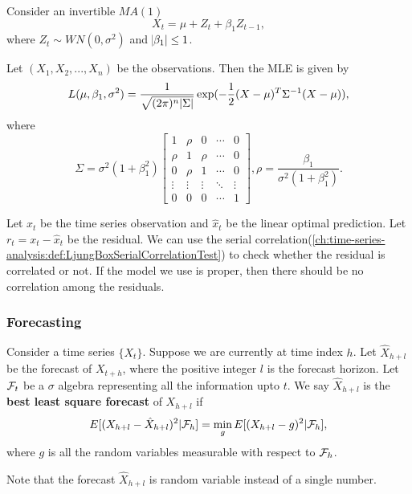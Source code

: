 \begin{example}
Consider an invertible $MA(1)$ 
$$X_t = \mu + Z_t + \beta_1 Z_{t-1},$$
where $Z_t\sim WN(0, \sigma^2)$ and $\abs{\beta_1}\leq 1$.

Let $(X_1,X_2,...,X_n)$ be the observations. Then the MLE is given by
$$L(\mu, \beta_1, \sigma^2) = \frac{1}{\sqrt{(2\pi)^n \abs{\Sigma}}} \exp(-\frac{1}{2}(X-\mu)^T\Sigma^{-1}(X-\mu)),$$
where  	
$$\Sigma = \sigma^2(1 + \beta_1^2)\begin{bmatrix}
1 & \rho & 0 & \cdots & 0\\ 
\rho & 1 & \rho & \cdots & 0\\ 
0 & \rho & 1 & \cdots & 0\\ 
\vdots & \vdots & \vdots & \ddots & \vdots\\ 
0 & 0 & 0 & \cdots & 1
\end{bmatrix}, \rho = \frac{\beta_1}{\sigma^2(1 + \beta_1^2)}.$$	
\end{example}


\begin{remark}
	Let $x_t$ be the time series observation and $\hat{x}_t$ be the linear optimal prediction. Let $r_t = x_t - \hat{x}_t$ be the residual. 	
	We can use the serial correlation(\autoref{ch:time-series-analysis:def:LjungBoxSerialCorrelationTest}) to check whether the residual is correlated or not. If the model we use is proper, then there should be no correlation among the residuals.
\end{remark}

\subsubsection{Forecasting}

\begin{definition}\cite[54]{tsay2005analysis}
Consider a time series $\{X_t\}$. Suppose we are currently at time index $h$. Let $\hat{X}_{h+l}$ be the forecast of $X_{t+h}$, where the positive integer $l$ is the forecast horizon. Let $\mathcal{F}_t$ be a $\sigma$ algebra representing all the information upto $t$. 
We say $\hat{X}_{h+l}$ is the \textbf{best least square forecast} of $X_{h+l}$ if
$$E[(X_{h+l} - \hat{X}_{h+l})^2|\mathcal{F}_h] = \min_{g} E[(X_{h+l} - g)^2|\mathcal{F}_h], $$
where $g$ is all the random variables measurable with respect to $\mathcal{F}_h$.   	
\end{definition}


\begin{remark}[interpretation]
Note that the forecast $\hat{X}_{h+l}$ is random variable instead of a single number. 
\end{remark}

